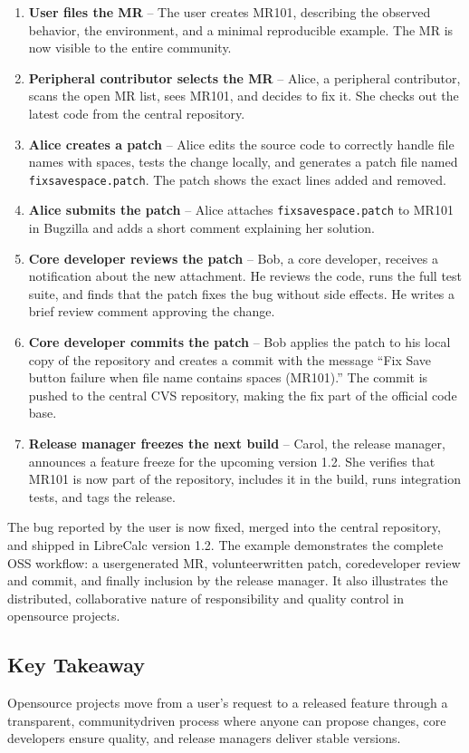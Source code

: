 \documentclass[12pt, a4paper]{article}
\begin{document}
\begin{enumerate}
  \item \textbf{User files the MR} -- The user creates MR101, describing the observed behavior, the environment, and a minimal reproducible example.  The MR is now visible to the entire community.
  \item \textbf{Peripheral contributor selects the MR} -- Alice, a peripheral contributor, scans the open MR list, sees MR101, and decides to fix it. She checks out the latest code from the central repository.
  \item \textbf{Alice creates a patch} -- Alice edits the source code to correctly handle file names with spaces, tests the change locally, and generates a patch file named \texttt{fixsavespace.patch}.  The patch shows the exact lines added and removed.
  \item \textbf{Alice submits the patch} -- Alice attaches \texttt{fixsavespace.patch} to MR101 in Bugzilla and adds a short comment explaining her solution.
  \item \textbf{Core developer reviews the patch} -- Bob, a core developer, receives a notification about the new attachment. He reviews the code, runs the full test suite, and finds that the patch fixes the bug without side effects.  He writes a brief review comment approving the change.
  \item \textbf{Core developer commits the patch} -- Bob applies the patch to his local copy of the repository and creates a commit with the message ``Fix Save button failure when file name contains spaces (MR101).''  The commit is pushed to the central CVS repository, making the fix part of the official code base.
  \item \textbf{Release manager freezes the next build} -- Carol, the release manager, announces a feature freeze for the upcoming version 1.2. She verifies that MR101 is now part of the repository, includes it in the build, runs integration tests, and tags the release.
\end{enumerate}

The bug reported by the user is now fixed, merged into the central repository, and shipped in LibreCalc version 1.2.  The example demonstrates the complete OSS workflow: a usergenerated MR, volunteerwritten patch, coredeveloper review and commit, and finally inclusion by the release manager.  It also illustrates the distributed, collaborative nature of responsibility and quality control in opensource projects.

\subsection{Key Takeaway}
Opensource projects move from a user's request to a released feature through a transparent, communitydriven process where anyone can propose changes, core developers ensure quality, and release managers deliver stable versions.
\end{document}
